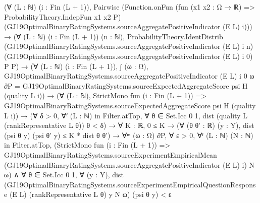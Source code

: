 \documentclass[10pt]{article}
\begin{document}
\begin{ReviewVerbatim}
                      (∀ (L : ℕ) (i : Fin (L + 1)),
                          Pairwise
                            (Function.onFun (fun (x1 x2 : Ω → ℝ) => ProbabilityTheory.IndepFun x1 x2 P)
                              (GJ19OptimalBinaryRatingSystems.sourceAggregatePositiveIndicator (E L) i))) →
                        (∀ (L : ℕ) (i : Fin (L + 1)) (n : ℕ),
                            ProbabilityTheory.IdentDistrib
                              (GJ19OptimalBinaryRatingSystems.sourceAggregatePositiveIndicator (E L) i n)
                              (GJ19OptimalBinaryRatingSystems.sourceAggregatePositiveIndicator (E L) i 0) P P) →
                          (∀ (L : ℕ) (i : Fin (L + 1)),
                              ∫ (ω : Ω),
                                  GJ19OptimalBinaryRatingSystems.sourceAggregatePositiveIndicator (E L) i 0 ω ∂P =
                                GJ19OptimalBinaryRatingSystems.sourceExpectedAggregateScore psi H (quality L i)) →
                            (∀ (L : ℕ),
                                StrictMono fun (i : Fin (L + 1)) =>
                                  GJ19OptimalBinaryRatingSystems.sourceExpectedAggregateScore psi H (quality L i)) →
                              (∀ δ > 0,
                                  ∀ᶠ (L : ℕ) in Filter.atTop,
                                    ∀ θ ∈ Set.Icc 0 1, dist (quality L (rankRepresentative L θ)) θ < δ) →
                                ∀ {K : ℝ},
                                  0 ≤ K →
                                    (∀ (θ θ' : ℝ) (y : Y), dist (psi θ y) (psi θ' y) ≤ K * dist θ θ') →
                                      ∀ᵐ (ω : Ω) ∂P,
                                        ∀ ε > 0,
                                          ∀ᶠ (L : ℕ) (N : ℕ) in Filter.atTop,
                                            (StrictMono fun (i : Fin (L + 1)) =>
                                                GJ19OptimalBinaryRatingSystems.sourceExperimentEmpiricalMean
                                                  (GJ19OptimalBinaryRatingSystems.sourceAggregatePositiveIndicator (E L)
                                                    i)
                                                  N ω) ∧
                                              ∀ θ ∈ Set.Icc 0 1,
                                                ∀ (y : Y),
                                                  dist
                                                      (GJ19OptimalBinaryRatingSystems.sourceExperimentEmpiricalQuestionResponse
                                                        (E L) (rankRepresentative L θ) y N ω)
                                                      (psi θ y) <
                                                    ε
\end{ReviewVerbatim}
\end{document}
